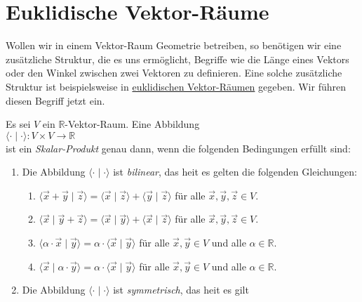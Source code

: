 \section{Euklidische Vektor-R\"{a}ume}
Wollen wir in einem Vektor-Raum Geometrie betreiben, so ben\"otigen wir eine zus\"atzliche Struktur,
die es uns erm\"oglicht,  Begriffe wie die L\"ange eines Vektors oder den Winkel zwischen
zwei Vektoren zu definieren.  Eine solche zus\"atzliche Struktur ist beispielsweise in
\href{https://de.wikipedia.org/wiki/Euklidischer_Raum}{euklidischen Vektor-R\"aumen} gegeben.  Wir
f\"uhren diesen Begriff jetzt ein.

\begin{Definition} \lb
  Es sei $V$ ein $\mathbb{R}$-Vektor-Raum.  Eine Abbildung 
  \\[0.2cm]
  \hspace*{1.3cm}
  $\langle \cdot \mid \cdot \rangle: V \times V \rightarrow \mathbb{R}$
  \\[0.2cm]
  ist ein \emph{\color{blue}Skalar-Produkt} genau dann, wenn die folgenden Bedingungen erf\"{u}llt sind:
  \begin{enumerate}
  \item Die Abbildung $\langle \cdot\mid \cdot \rangle$ ist \emph{\color{blue}bilinear}, das hei\3t es gelten die
        folgenden Gleichungen:
        \begin{enumerate}
        \item $\langle \vec{x} + \vec{y}\mid \vec{z} \rangle = \langle \vec{x}\mid \vec{z} \rangle + \langle \vec{y}\mid \vec{z} \rangle$
              \quad f\"{u}r alle $\vec{x}, \vec{y}, \vec{z} \in V$.
        \item $\langle \vec{x}\mid \vec{y} + \vec{z} \rangle = \langle \vec{x}\mid \vec{y} \rangle + \langle \vec{x}\mid \vec{z} \rangle$
              \quad f\"{u}r alle $\vec{x}, \vec{y}, \vec{z} \in V$.
        \item $\langle \alpha \cdot \vec{x}\mid \vec{y} \rangle = \alpha \cdot \langle \vec{x}\mid \vec{y} \rangle$
              \quad f\"{u}r alle $\vec{x}, \vec{y} \in V$ und alle $\alpha \in \mathbb{R}$.
        \item $\langle \vec{x}\mid \alpha \cdot \vec{y} \rangle = \alpha \cdot \langle \vec{x}\mid \vec{y} \rangle$
              \quad f\"{u}r alle $\vec{x}, \vec{y} \in V$ und alle $\alpha \in \mathbb{R}$.
        \end{enumerate}
  \item Die Abbildung  $\langle \cdot\mid \cdot \rangle$ ist \emph{\color{blue}symmetrisch}, das hei\3t es gilt

\end{enumerate}
\end{Definition}
